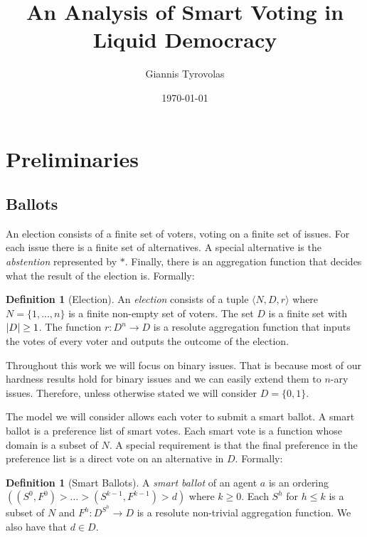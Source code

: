 \documentclass[11pt,a4paper, titlepage]{article}
\title{An Analysis of Smart Voting in Liquid Democracy}
\author{Giannis Tyrovolas}
\date{\today}
\DeclarePairedDelimiter\abs{\lvert}{\rvert}
\theoremstyle{definition}
\newtheorem{definition}[theorem]{Definition}
\begin{document}
\maketitle

\tableofcontents

\newpage

\section{Preliminaries}

\subsection{Ballots}


An election consists of a finite set of voters, voting on a finite set of issues. For each issue there is a finite set of alternatives. A special alternative is the \emph{abstention} represented by $*$. Finally, there is an aggregation function that decides what the result of the election is. Formally:

\begin{definition}[Election]
    An \emph{election} consists of a tuple $\langle N, D, r\rangle $ where $N = \{1,..., n\} $ is a finite non-empty set of voters. The set $D$ is a finite set with $\abs{D} \geq 1$. The function $r \colon D^n \longrightarrow D$ is a resolute aggregation function that inputs the votes of every voter and outputs the outcome of the election.
\end{definition}

Throughout this work we will focus on binary issues. 
That is because most of our hardness results hold for binary issues and we can easily extend them to $n$-ary issues. Therefore, unless otherwise stated we will consider $D = \{0, 1\}$.

The model we will consider allows each voter to submit a smart ballot. 
A smart ballot is a preference list of smart votes. 
Each smart vote is a function whose domain is a subset of $N$. 
A special requirement is that the final preference in the preference list is a direct vote on an alternative in $D$. Formally:

\begin{definition}[Smart Ballots]
    A \emph{smart ballot} of an agent $a$ is an ordering $( (S^0, F^0) > \ldots > (S^{k-1}, F^{k-1}) > d)$ where $k \geq 0$. Each $S^h$ for $h \leq k$ is a subset of $N$ and $F^h \colon D^{S^h} \longrightarrow D$ is a resolute non-trivial aggregation function. We also have that $d \in D$.   
\end{definition}
\end{document}

